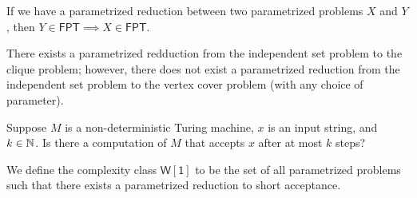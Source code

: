 \begin{remark}
	If we have a parametrized reduction between two parametrized problems
	$X$ and $Y$, then $Y \in \mathsf{FPT} \implies X \in \mathsf{FPT}$.
\end{remark}

\begin{example}[]
	There exists a parametrized redduction from the independent set problem
	to the clique problem; however, there does not exist a parametrized 
	reduction from the independent set problem to the vertex cover problem
	(with any choice of parameter).
\end{example}

\begin{problem}
	Suppose $M$ is a non-deterministic Turing machine,
	$x$ is an input string, and $k \in \mathbb{N}$.
	Is there a computation of $M$ that accepts $x$ after at most $k$ steps?
\end{problem}

\begin{definition}[$\mathsf{W[1]}$]
	We define the complexity class $\mathsf{W[1]}$
	to be the set of all parametrized problems
	such that there exists a parametrized reduction to 
	short acceptance.
\end{definition}


